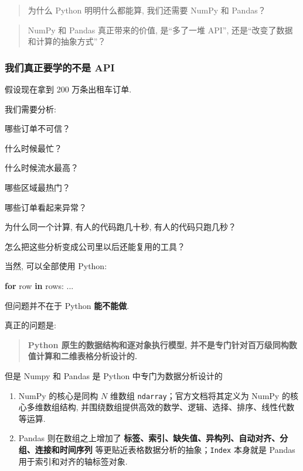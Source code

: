 \documentclass[11pt]{article}
\providecommand{\tightlist}{%
      \setlength{\itemsep}{0pt}\setlength{\parskip}{0pt}}
\newenvironment{Shaded}{}{}
\newcommand{\KeywordTok}[1]{\textcolor[rgb]{0.00,0.44,0.13}{\textbf{{#1}}}}
\newcommand{\NormalTok}[1]{{#1}}
\newcommand{\ControlFlowTok}[1]{\textcolor[rgb]{0.00,0.44,0.13}{\textbf{{#1}}}}
\begin{document}
\begin{quote}
为什么 Python 明明什么都能算, 我们还需要 NumPy 和 Pandas？
\end{quote}

\begin{quote}
NumPy 和 Pandas 真正带来的价值, 是``多了一堆 API'',
还是``改变了数据和计算的抽象方式''？
\end{quote}

\subsubsection{我们真正要学的不是
API}\label{ux6211ux4eecux771fux6b63ux8981ux5b66ux7684ux4e0dux662f-api}

假设现在拿到 200 万条出租车订单.

我们需要分析:

\begin{Shaded}
\begin{Highlighting}[]
\NormalTok{哪些订单不可信？}

\NormalTok{什么时候最忙？}

\NormalTok{什么时候流水最高？}

\NormalTok{哪些区域最热门？}

\NormalTok{哪些订单看起来异常？}

\NormalTok{为什么同一个计算, 有人的代码跑几十秒, 有人的代码只跑几秒？}

\NormalTok{怎么把这些分析变成公司里以后还能复用的工具？}
\end{Highlighting}
\end{Shaded}

当然, 可以全部使用 Python:

\begin{Shaded}
\begin{Highlighting}[]
\ControlFlowTok{for}\NormalTok{ row }\KeywordTok{in}\NormalTok{ rows:}
\NormalTok{    ...}
\end{Highlighting}
\end{Shaded}

但问题并不在于 Python \textbf{能不能做}.

真正的问题是:

\begin{quote}
\textbf{Python 原生的数据结构和逐对象执行模型,
并不是专门针对百万级同构数值计算和二维表格分析设计的. }
\end{quote}

但是 Numpy 和 Pandas 是 Python 中专门为数据分析设计的

\begin{enumerate}
\def\labelenumi{\arabic{enumi}.}
\tightlist
\item
  NumPy 的核心是同构 \(N\) 维数组 \texttt{ndarray}；官方文档将其定义为
  NumPy 的核心多维数组结构,
  并围绕数组提供高效的数学、逻辑、选择、排序、线性代数等运算.
\item
  Pandas 则在数组之上增加了
  \textbf{标签、索引、缺失值、异构列、自动对齐、分组、连接和时间序列}
  等更贴近表格数据分析的抽象；\texttt{Index} 本身就是 Pandas
  用于索引和对齐的轴标签对象.
\end{enumerate}
\end{document}
